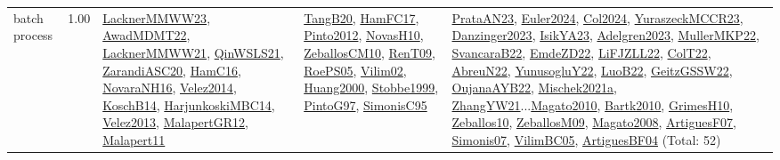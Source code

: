 {\begin{longtable}{p{3cm}r>{\raggedright\arraybackslash}p{6cm}>{\raggedright\arraybackslash}p{6cm}>{\raggedright\arraybackslash}p{8cm}}
\index{batch process}\index{Concepts!batch process}batch process &  1.00 & \hyperref[detail:LacknerMMWW23]{LacknerMMWW23}, \hyperref[detail:AwadMDMT22]{AwadMDMT22}, \hyperref[detail:LacknerMMWW21]{LacknerMMWW21}, \hyperref[detail:QinWSLS21]{QinWSLS21}, \hyperref[detail:ZarandiASC20]{ZarandiASC20}, \hyperref[detail:HamC16]{HamC16}, \hyperref[detail:NovaraNH16]{NovaraNH16}, \hyperref[detail:Velez2014]{Velez2014}, \hyperref[detail:KoschB14]{KoschB14}, \hyperref[detail:HarjunkoskiMBC14]{HarjunkoskiMBC14}, \hyperref[detail:Velez2013]{Velez2013}, \hyperref[detail:MalapertGR12]{MalapertGR12}, \hyperref[detail:Malapert11]{Malapert11} & \hyperref[detail:TangB20]{TangB20}, \hyperref[detail:HamFC17]{HamFC17}, \hyperref[detail:Pinto2012]{Pinto2012}, \hyperref[detail:NovasH10]{NovasH10}, \hyperref[detail:ZeballosCM10]{ZeballosCM10}, \hyperref[detail:RenT09]{RenT09}, \hyperref[detail:RoePS05]{RoePS05}, \hyperref[detail:Vilim02]{Vilim02}, \hyperref[detail:Huang2000]{Huang2000}, \hyperref[detail:Stobbe1999]{Stobbe1999}, \hyperref[detail:PintoG97]{PintoG97}, \hyperref[detail:SimonisC95]{SimonisC95} & \hyperref[detail:PrataAN23]{PrataAN23}, \hyperref[detail:Euler2024]{Euler2024}, \hyperref[detail:Col2024]{Col2024}, \hyperref[detail:YuraszeckMCCR23]{YuraszeckMCCR23}, \hyperref[detail:Danzinger2023]{Danzinger2023}, \hyperref[detail:IsikYA23]{IsikYA23}, \hyperref[detail:Adelgren2023]{Adelgren2023}, \hyperref[detail:MullerMKP22]{MullerMKP22}, \hyperref[detail:SvancaraB22]{SvancaraB22}, \hyperref[detail:EmdeZD22]{EmdeZD22}, \hyperref[detail:LiFJZLL22]{LiFJZLL22}, \hyperref[detail:ColT22]{ColT22}, \hyperref[detail:AbreuN22]{AbreuN22}, \hyperref[detail:YunusogluY22]{YunusogluY22}, \hyperref[detail:LuoB22]{LuoB22}, \hyperref[detail:GeitzGSSW22]{GeitzGSSW22}, \hyperref[detail:OujanaAYB22]{OujanaAYB22}, \hyperref[detail:Mischek2021a]{Mischek2021a}, \hyperref[detail:ZhangYW21]{ZhangYW21}...\hyperref[detail:Magato2010]{Magato2010}, \hyperref[detail:Bartk2010]{Bartk2010}, \hyperref[detail:GrimesH10]{GrimesH10}, \hyperref[detail:Zeballos10]{Zeballos10}, \hyperref[detail:ZeballosM09]{ZeballosM09}, \hyperref[detail:Magato2008]{Magato2008}, \hyperref[detail:ArtiguesF07]{ArtiguesF07}, \hyperref[detail:Simonis07]{Simonis07}, \hyperref[detail:VilimBC05]{VilimBC05}, \hyperref[detail:ArtiguesBF04]{ArtiguesBF04} (Total: 52)\\

\end{longtable}}
